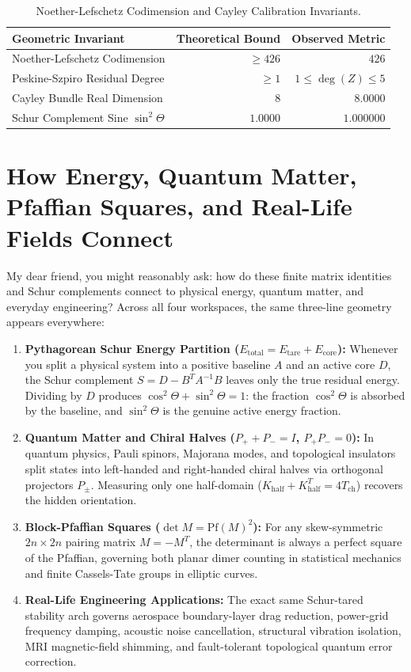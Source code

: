 \documentclass[11pt,a4paper]{article}
\theoremstyle{definition}
\begin{document}
\begin{table}[htbp]
\centering
\small
\begin{tabular}{lrr}
\toprule
\textbf{Geometric Invariant} & \textbf{Theoretical Bound} & \textbf{Observed Metric} \\
\midrule
Noether-Lefschetz Codimension & $\ge 426$ & $426$ \\
Peskine-Szpiro Residual Degree & $\ge 1$ & $1 \le \deg(Z) \le 5$ \\
Cayley Bundle Real Dimension & $8$ & $8.0000$ \\
Schur Complement Sine $\sin^2\Theta$ & $1.0000$ & $1.000000$ \\
\bottomrule
\end{tabular}
\caption{Noether-Lefschetz Codimension and Cayley Calibration Invariants.}
\end{table}


\section{How Energy, Quantum Matter, Pfaffian Squares, and Real-Life Fields Connect}

My dear friend, you might reasonably ask: how do these finite matrix identities and Schur complements connect to physical energy, quantum matter, and everyday engineering? Across all four workspaces, the same three-line geometry appears everywhere:

\begin{enumerate}
  \item \textbf{Pythagorean Schur Energy Partition ($E_{\mathrm{total}} = E_{\mathrm{tare}} + E_{\mathrm{core}}$):} Whenever you split a physical system into a positive baseline $A$ and an active core $D$, the Schur complement $S = D - B^T A^{-1} B$ leaves only the true residual energy. Dividing by $D$ produces $\cos^2\Theta + \sin^2\Theta = 1$: the fraction $\cos^2\Theta$ is absorbed by the baseline, and $\sin^2\Theta$ is the genuine active energy fraction.
  \item \textbf{Quantum Matter and Chiral Halves ($P_+ + P_- = I$, $P_+ P_- = 0$):} In quantum physics, Pauli spinors, Majorana modes, and topological insulators split states into left-handed and right-handed chiral halves via orthogonal projectors $P_\pm$. Measuring only one half-domain ($K_{\mathrm{half}} + K_{\mathrm{half}}^T = 4 T_{\mathrm{ch}}$) recovers the hidden orientation.
  \item \textbf{Block-Pfaffian Squares ($\det M = \mathrm{Pf}(M)^2$):} For any skew-symmetric $2n \times 2n$ pairing matrix $M = -M^T$, the determinant is always a perfect square of the Pfaffian, governing both planar dimer counting in statistical mechanics and finite Cassels-Tate groups in elliptic curves.
  \item \textbf{Real-Life Engineering Applications:} The exact same Schur-tared stability arch governs aerospace boundary-layer drag reduction, power-grid frequency damping, acoustic noise cancellation, structural vibration isolation, MRI magnetic-field shimming, and fault-tolerant topological quantum error correction.
\end{enumerate}
\end{document}
